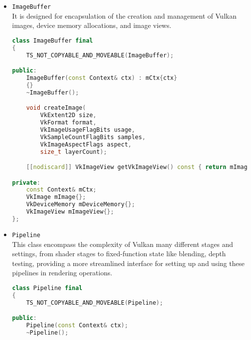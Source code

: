 \begin{itemize}
\begin{itemize}
\begin{lstlisting}[language=c++, caption=\texttt{DataBuffer} class (./engine/src/core/data\_buffer.h)]
public:
    DataBuffer(const Context& ctx);
    ~DataBuffer();

    void createDataBuffer(const VkBufferUsageFlags bufferUsageFlags, const VkMemoryPropertyFlags memoryProperties, const VkDeviceSize size);

    [[nodiscard]] VkBuffer getBuffer() const { return mBuffer; }

    void copyTo(const DataBuffer& target, VkCommandBuffer commandBuffer, VkQueue queue) const;
    void* map() const;
    void unmap() const;

private:
    const Context& mCtx;
    VkBuffer mBuffer{};
    VkDeviceMemory mDeviceMemory{};
    VkDeviceSize mSize{};
};
\end{lstlisting}
    \item \texttt{ImageBuffer}\\
    It is designed for encapsulation of the creation and management of Vulkan images, device memory allocations, and image views.
\begin{lstlisting}[language=c++, caption=\texttt{ImageBuffer} class (./engine/src/core/image\_buffer.h)]
class ImageBuffer final
{
    TS_NOT_COPYABLE_AND_MOVEABLE(ImageBuffer);

public:
    ImageBuffer(const Context& ctx) : mCtx{ctx}
    {}
    ~ImageBuffer();

    void createImage(
        VkExtent2D size,
        VkFormat format,
        VkImageUsageFlagBits usage,
        VkSampleCountFlagBits samples,
        VkImageAspectFlags aspect,
        size_t layerCount);

    [[nodiscard]] VkImageView getVkImageView() const { return mImageView; }

private:
    const Context& mCtx;
    VkImage mImage{};
    VkDeviceMemory mDeviceMemory{};
    VkImageView mImageView{};
};
\end{lstlisting}
    \item \texttt{Pipeline}\\
    This class encompass the complexity of Vulkan many different stages and settings, from shader stages to fixed-function state like blending, depth testing, providing a more streamlined interface for setting up and using these pipelines in rendering operations.
\begin{lstlisting}[language=c++, caption=\texttt{Pipeline} class (./engine/src/core/pipeline.h)]
class Pipeline final
{
    TS_NOT_COPYABLE_AND_MOVEABLE(Pipeline);

public:
    Pipeline(const Context& ctx);
    ~Pipeline();


\end{lstlisting}
\end{itemize}
\end{itemize}
